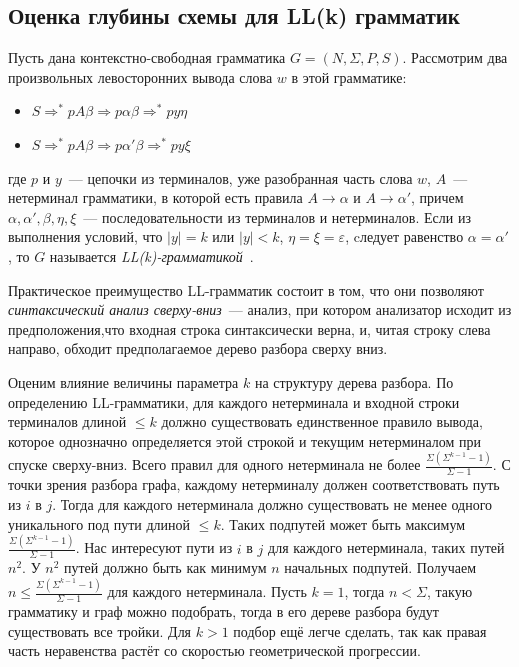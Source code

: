 \subsection{Оценка глубины схемы для LL(k) грамматик}
Пусть дана контекстно-свободная грамматика $G = (N, \Sigma, P, S)$. Рассмотрим два произвольных левосторонних вывода слова $w$ в этой грамматике:
\begin{itemize}
	\item $S \Rightarrow^* pA\beta \Rightarrow p \alpha \beta \Rightarrow^* py \eta$
	\item $S \Rightarrow^* pA\beta \Rightarrow p \alpha' \beta \Rightarrow^* py \xi$
\end{itemize}
где $p$ и $y$~--- цепочки из терминалов, уже разобранная часть слова $w$, $A$~--- нетерминал грамматики, в которой есть правила $A \rightarrow \alpha$ и $A \rightarrow \alpha'$, причем $\alpha, \alpha', \beta, \eta, \xi$~--- последовательности из терминалов и нетерминалов. Если из выполнения условий, что $|y| = k$ или $|y| < k$, $\eta = \xi = \varepsilon$, cледует равенство $\alpha = \alpha'$, то $G$ называется \textit{LL(k)-грамматикой}~\cite{LL}.

Практическое преимущество LL-грамматик состоит в том, что они позволяют \textit{синтаксический анализ сверху-вниз}~--- анализ, при котором анализатор исходит из предположения,что входная строка синтаксически верна, и, читая строку слева направо, обходит предполагаемое дерево разбора сверху вниз.

Оценим влияние величины параметра $k$ на структуру дерева разбора. По определению LL-грамматики, для каждого нетерминала и входной строки терминалов длиной $\le k$ должно существовать единственное правило вывода, которое однозначно определяется этой строкой и текущим нетерминалом при спуске сверху-вниз. Всего правил для одного нетерминала не более $\frac{\Sigma(\Sigma^{k-1} - 1)}{\Sigma -1}$. С точки зрения разбора графа, каждому нетерминалу должен соответствовать путь из $i$ в $j$. Тогда для каждого нетерминала должно существовать не менее одного уникального под пути длиной $\le k$. Таких подпутей может быть максимум $\frac{\Sigma(\Sigma^{k-1} - 1)}{\Sigma -1}$. Нас интересуют пути из $i$ в $j$ для каждого нетерминала, таких путей $n^2$. У $n^2$ путей должно быть как минимум $n$ начальных подпутей. Получаем $n \le \frac{\Sigma(\Sigma^{k-1} - 1)}{\Sigma -1}$ для каждого нетерминала. Пусть $k = 1$, тогда $n < \Sigma$, такую грамматику и граф можно подобрать, тогда в его дереве разбора будут существовать все тройки. Для $k>1$ подбор ещё легче сделать, так как правая часть неравенства растёт со скоростью геометрической прогрессии. 

